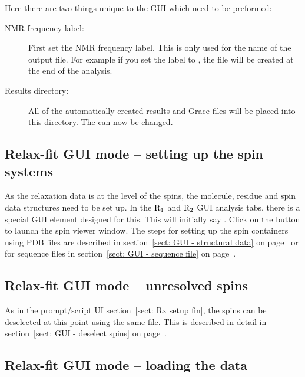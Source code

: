 Here there are two things unique to the GUI which need to be preformed:

\begin{description}
\item[NMR frequency label:]  First set the NMR frequency label.  This is only used for the name of the output file.  For example if you set the label to , the file  will be created at the end of the analysis.
\item[Results directory:]  All of the automatically created results and Grace files will be placed into this directory.  The  can now be changed.
\end{description}



\subsection{Relax-fit GUI mode -- setting up the spin systems}

As the relaxation data is at the level of the spins, the molecule, residue and spin data structures need to be set up.  In the $\mathrm{R}_1$ and $\mathrm{R}_2$ GUI analysis tabs, there is a special  GUI element designed for this.  This will initially say .  Click on the  button to launch the spin viewer window.  The steps for setting up the spin containers using PDB files are described in section~\ref{sect: GUI - structural data} on page~\pageref{sect: GUI - structural data} or for sequence files in section~\ref{sect: GUI - sequence file} on page~\pageref{sect: GUI - sequence file}.



\subsection{Relax-fit GUI mode -- unresolved spins}

As in the prompt/script UI section~\ref{sect: Rx setup fin}, the spins can be deselected at this point using the same  file.  This is described in detail in section~\ref{sect: GUI - deselect spins} on page~\pageref{sect: GUI - deselect spins}.




\subsection{Relax-fit GUI mode -- loading the data}

